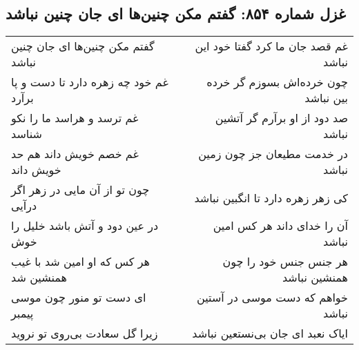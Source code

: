 \begin{center}
\section*{غزل شماره ۸۵۴: گفتم مکن چنین‌ها ای جان چنین نباشد}
\label{sec:0854}
\begin{longtable}{l p{0.5cm} r}
گفتم مکن چنین‌ها ای جان چنین نباشد
&&
غم قصد جان ما کرد گفتا خود این نباشد
\\
غم خود چه زهره دارد تا دست و پا برآرد
&&
چون خرده‌اش بسوزم گر خرده بین نباشد
\\
غم ترسد و هراسد ما را نکو شناسد
&&
صد دود از او برآرم گر آتشین نباشد
\\
غم خصم خویش داند هم حد خویش داند
&&
در خدمت مطیعان جز چون زمین نباشد
\\
چون تو از آن مایی در زهر اگر درآیی
&&
کی زهر زهره دارد تا انگبین نباشد
\\
در عین دود و آتش باشد خلیل را خوش
&&
آن را خدای داند هر کس امین نباشد
\\
هر کس که او امین شد با غیب همنشین شد
&&
هر جنس جنس خود را چون همنشین نباشد
\\
ای دست تو منور چون موسی پیمبر
&&
خواهم که دست موسی در آستین نباشد
\\
زیرا گل سعادت بی‌روی تو نروید
&&
ایاک نعبد ای جان بی‌نستعین نباشد
\\
\end{longtable}
\end{center}
